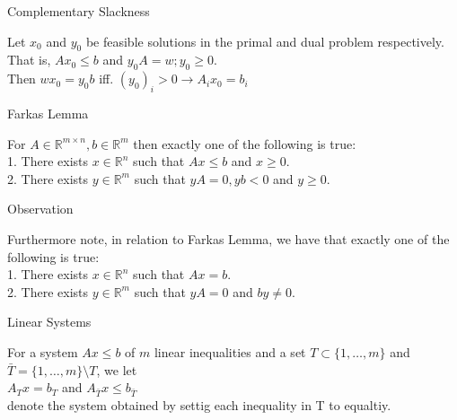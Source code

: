 \documentclass{beamer}
\begin{document}

\begin{frame}  %

	\begin{block}{Complementary Slackness}

		Let $x_0$ and $y_0$ be feasible solutions in the primal and dual problem respectively.
		That is, $Ax_0 \leq b$ and $y_0 A = w; y_0 \geq 0$. \\
		Then $w x_0 = y_0 b$ iff. $(y_0)_i > 0  \rightarrow A_i x_0 = b_i$

	\end{block}	

	\begin{block}{Farkas Lemma}

		For $A \in \mathbb{R}^{m \times n}, b \in \mathbb{R}^{m}$ then exactly one of the following is true: \\
		1. There exists $x \in \mathbb{R}^n$ such that $Ax \leq b$ and $x\geq 0$. \\
		2. There exists $y \in \mathbb{R}^m$ such that $yA=0, yb<0$ and $y \geq 0$. 

	\end{block}

	\begin{block}{Observation}

		Furthermore note, in relation to Farkas Lemma, we have that exactly one of the following is true: \\
		1. There exists $x \in \mathbb{R}^n$ such that $Ax=b$. \\
		2. There exists $y \in \mathbb{R}^m$ such that $yA=0$ and $by \neq 0$.


	\end{block}

\end{frame}


\begin{frame}

	\begin{block}{Linear Systems}

		For a system $Ax \leq b$ of $m$ linear inequalities and a set $T\subset \{1, \dots, m \}$ and $\bar{T} = \{1, \dots, m \} \setminus T$, we let\\ $A_T x = b_T$ and $A_{\bar{T}} x \leq b_{\bar{T}}$ \\denote the system obtained by settig each inequality in T to equaltiy. 

	\end{block}

\end{frame}
\end{document}
